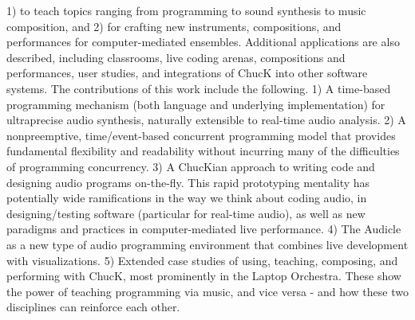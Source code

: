 1) to teach topics ranging from programming to sound synthesis to music composition, 
and 2) for crafting new instruments, compositions, and performances for
computer-mediated ensembles. Additional applications are also described, including 
classrooms, live coding arenas, compositions and performances, user studies,
and integrations of ChucK into other software systems.
The contributions of this work include the following. 1) A time-based programming 
mechanism (both language and underlying implementation) for ultraprecise audio 
synthesis, naturally extensible to real-time audio analysis. 2) A nonpreemptive, 
time/event-based concurrent programming model that provides fundamental flexibility 
and readability without incurring many of the difficulties of
programming concurrency. 3) A ChucKian approach to writing code and designing audio 
programs on-the-fly. This rapid prototyping mentality has potentially
wide ramifications in the way we think about coding audio, in designing/testing
software (particular for real-time audio), as well as new paradigms and practices
in computer-mediated live performance. 4) The Audicle as a new type of audio
programming environment that combines live development with visualizations. 5)
Extended case studies of using, teaching, composing, and performing with ChucK,
most prominently in the Laptop Orchestra. These show the power of teaching programming 
via music, and vice versa - and how these two disciplines can reinforce
each other.